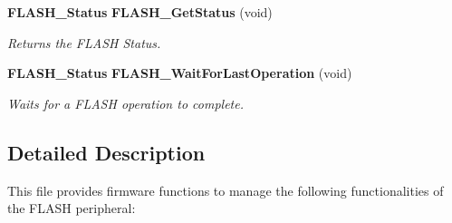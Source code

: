 \begin{DoxyCompactItemize}
\textbf{ F\+L\+A\+S\+H\+\_\+\+Status} \textbf{ F\+L\+A\+S\+H\+\_\+\+Get\+Status} (void)
\begin{DoxyCompactList}\small\item\em Returns the F\+L\+A\+SH Status. \end{DoxyCompactList}\item 
\textbf{ F\+L\+A\+S\+H\+\_\+\+Status} \textbf{ F\+L\+A\+S\+H\+\_\+\+Wait\+For\+Last\+Operation} (void)
\begin{DoxyCompactList}\small\item\em Waits for a F\+L\+A\+SH operation to complete. \end{DoxyCompactList}\end{DoxyCompactItemize}


\subsection{Detailed Description}
This file provides firmware functions to manage the following functionalities of the F\+L\+A\+SH peripheral\+: 

